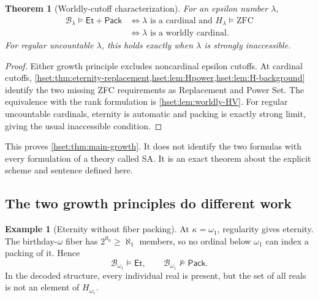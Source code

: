 \documentclass[11pt,letterpaper]{article}
\newtheorem{theorem}{Theorem}[section]
\theoremstyle{definition}
\newtheorem{example}[example]{Example}\aliascntresetthe{example}
\theoremstyle{remark}
\newcommand{\B}{\mathcal B}
\newcommand{\Et}{\mathsf{Et}}
\newcommand{\Pack}{\mathsf{Pack}}
\begin{document}
\begin{theorem}[Worldly-cutoff characterization]
\label{hset:thm:worldly}
For an epsilon number $\lambda$,
\begin{align*}
 \B_\lambda\models\Et+\Pack
 &\iff \lambda\text{ is a cardinal and }H_\lambda\models\mathrm{ZFC}\\
 &\iff \lambda\text{ is a worldly cardinal}.
\end{align*}
For regular uncountable $\lambda$, this holds exactly when $\lambda$ is
strongly inaccessible.
\end{theorem}
\begin{proof}
Either growth principle excludes noncardinal epsilon cutoffs. At cardinal
cutoffs,
\cref{hset:thm:eternity-replacement,hset:lem:Hpower,hset:lem:H-background}
identify the two missing ZFC requirements as Replacement and Power Set.
The equivalence with the rank formulation is \cref{hset:lem:worldly-HV}.
For regular uncountable cardinals, eternity is automatic and packing is
exactly strong limit, giving the usual inaccessible condition.
\end{proof}

This proves \cref{hset:thm:main-growth}. It does not identify the two formulas
with every formulation of a theory called SA. It is an exact theorem about the
explicit scheme and sentence defined here.

\subsection{The two growth principles do different work}

\begin{example}[Eternity without fiber packing]
At $\kappa=\omega_1$, regularity gives eternity. The birthday-$\omega$ fiber
has $2^{\aleph_0}\ge\aleph_1$ members, so no ordinal below $\omega_1$ can
index a packing of it. Hence
\[
 \B_{\omega_1}\models\Et,
 \qquad\B_{\omega_1}\not\models\Pack.
\]
In the decoded structure, every individual real is present, but the set of
all reals is not an element of $H_{\omega_1}$.
\end{example}
\end{document}
